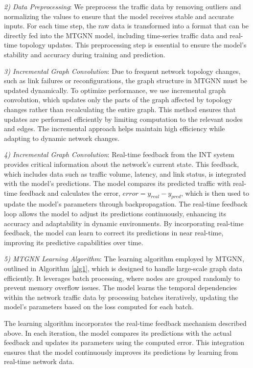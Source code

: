 \documentclass[journal]{IEEEtran}
\begin{document}
\emph{2) Data Preprocessing}: We preprocess the traffic data by removing outliers and normalizing the values to ensure that the model receives stable and accurate inputs. For each time step, the raw data is transformed into a format that can be directly fed into the MTGNN model, including time-series traffic data and real-time topology updates. This preprocessing step is essential to ensure the model's stability and accuracy during training and prediction.

\emph{3) Incremental Graph Convolution}: Due to frequent network topology changes, such as link failures or reconfigurations, the graph structure in MTGNN must be updated dynamically. To optimize performance, we use incremental graph convolution, which updates only the parts of the graph affected by topology changes rather than recalculating the entire graph. This method ensures that updates are performed efficiently by limiting computation to the relevant nodes and edges. The incremental approach helps maintain high efficiency while adapting to dynamic network changes.

\emph{4) Incremental Graph Convolution}: Real-time feedback from the INT system provides critical information about the network’s current state. This feedback, which includes data such as traffic volume, latency, and link status, is integrated with the model's predictions. The model compares its predicted traffic with real-time feedback and calculates the error, $error = y_{real}-y_{pred}$, which is then used to update the model’s parameters through backpropagation. The real-time feedback loop allows the model to adjust its predictions continuously, enhancing its accuracy and adaptability in dynamic environments. By incorporating real-time feedback, the model can learn to correct its predictions in near real-time, improving its predictive capabilities over time.



\emph{5) MTGNN Learning Algorithm}: The learning algorithm employed by MTGNN, outlined in Algorithm \ref{alg1}, which is designed to handle large-scale graph data efficiently.  It leverages batch processing, where nodes are grouped randomly to prevent memory overflow issues.  The model learns the temporal dependencies within the network traffic data by processing batches iteratively, updating the model’s parameters based on the loss computed for each batch.

The learning algorithm incorporates the real-time feedback mechanism described above.  In each iteration, the model compares its predictions with the actual feedback and updates its parameters using the computed error.  This integration ensures that the model continuously improves its predictions by learning from real-time network data.
\end{document}
